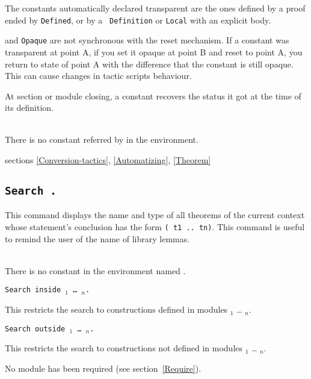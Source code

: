 The constants automatically declared transparent are the ones defined by a proof ended by {\tt Defined}, or by a {\tt
  Definition} or {\tt Local} with an explicit body.

 and \texttt{Opaque} are not synchronous
with the reset mechanism. If a constant was transparent at point A, if
you set it opaque at point B and reset to point A, you return to state
of point A with the difference that the constant is still opaque. This
can cause changes in tactic scripts behaviour.

At section or module closing, a constant recovers the status it got at
the time of its definition.


\begin{ErrMsgs}
\item {}\\
    There is no constant referred by {\qualid} in the environment.
\end{ErrMsgs}

\SeeAlso sections \ref{Conversion-tactics}, \ref{Automatizing},
\ref{Theorem}

\subsection[\tt Search {\qualid}.]{\tt Search {\qualid}.}
This command displays the name and type of all theorems of the current
context whose statement's conclusion has the form {\tt ({\qualid} t1 ..
  tn)}.  This command is useful to remind the user of the name of
library lemmas.
\begin{ErrMsgs}
\item {}\\
    There is no constant in the environment named \qualid.
\end{ErrMsgs}

\begin{Variants}
\item
{\tt Search {\qualid} inside {\module$_1$} \ldots{} {\module$_n$}.}

This restricts the search to constructions defined in modules
{\module$_1$} \ldots{} {\module$_n$}.

\item {\tt Search {\qualid} outside {\module$_1$} \ldots{} {\module$_n$}.}

This restricts the search to constructions not defined in modules
{\module$_1$} \ldots{} {\module$_n$}.

\begin{ErrMsgs}
\item {}
No module \module{} has been required (see section~\ref{Require}).
\end{ErrMsgs}

\end{Variants}

